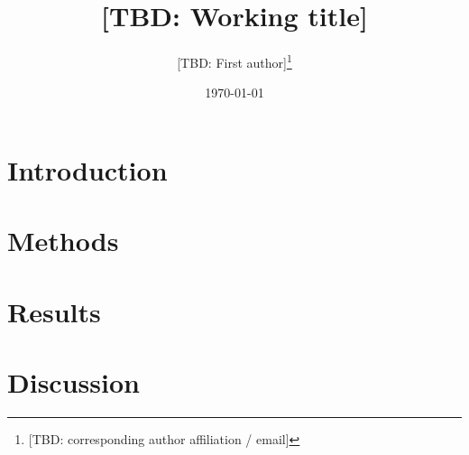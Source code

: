 \documentclass[11pt]{article}
\title{[TBD: Working title]}
\author{[TBD: First author]\thanks{[TBD: corresponding author affiliation / email]}}
\date{\today}
\begin{document}
\maketitle

\begin{abstract}

\end{abstract}

\section{Introduction}


\section{Methods}


\section{Results}


\section{Discussion}




\end{document}
